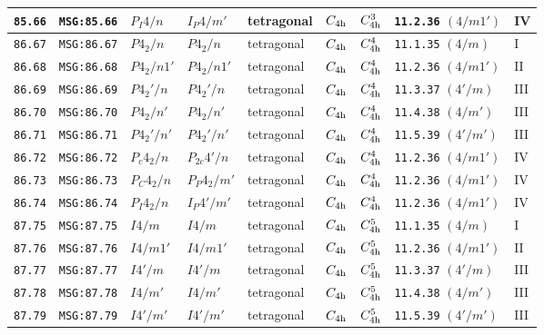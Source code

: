 \documentclass[fleqn,10pt]{jsarticle}
\begin{document}
\begin{center}
\begin{longtable}{lllllllll}
\texttt{85.66} & \texttt{MSG:85.66} & $P_{I}4/n$ & $I_{P}4/m'$ & tetragonal & $C_{\rm 4h}$ & $C_{\rm 4h}^{3}$ & \texttt{11.2.36} $(4/m1')$ & IV \\ \hline
\texttt{86.67} & \texttt{MSG:86.67} & $P4_{2}/n$ & $P4_{2}/n$ & tetragonal & $C_{\rm 4h}$ & $C_{\rm 4h}^{4}$ & \texttt{11.1.35} $(4/m)$ & I \\
\texttt{86.68} & \texttt{MSG:86.68} & $P4_{2}/n1'$ & $P4_{2}/n1'$ & tetragonal & $C_{\rm 4h}$ & $C_{\rm 4h}^{4}$ & \texttt{11.2.36} $(4/m1')$ & II \\
\texttt{86.69} & \texttt{MSG:86.69} & $P4_{2}'/n$ & $P4_{2}'/n$ & tetragonal & $C_{\rm 4h}$ & $C_{\rm 4h}^{4}$ & \texttt{11.3.37} $(4'/m)$ & III \\
\texttt{86.70} & \texttt{MSG:86.70} & $P4_{2}/n'$ & $P4_{2}/n'$ & tetragonal & $C_{\rm 4h}$ & $C_{\rm 4h}^{4}$ & \texttt{11.4.38} $(4/m')$ & III \\
\texttt{86.71} & \texttt{MSG:86.71} & $P4_{2}'/n'$ & $P4_{2}'/n'$ & tetragonal & $C_{\rm 4h}$ & $C_{\rm 4h}^{4}$ & \texttt{11.5.39} $(4'/m')$ & III \\
\texttt{86.72} & \texttt{MSG:86.72} & $P_{c}4_{2}/n$ & $P_{2c}4'/n$ & tetragonal & $C_{\rm 4h}$ & $C_{\rm 4h}^{4}$ & \texttt{11.2.36} $(4/m1')$ & IV \\
\texttt{86.73} & \texttt{MSG:86.73} & $P_{C}4_{2}/n$ & $P_{P}4_{2}/m'$ & tetragonal & $C_{\rm 4h}$ & $C_{\rm 4h}^{4}$ & \texttt{11.2.36} $(4/m1')$ & IV \\
\texttt{86.74} & \texttt{MSG:86.74} & $P_{I}4_{2}/n$ & $I_{P}4'/m'$ & tetragonal & $C_{\rm 4h}$ & $C_{\rm 4h}^{4}$ & \texttt{11.2.36} $(4/m1')$ & IV \\ \hline
\texttt{87.75} & \texttt{MSG:87.75} & $I4/m$ & $I4/m$ & tetragonal & $C_{\rm 4h}$ & $C_{\rm 4h}^{5}$ & \texttt{11.1.35} $(4/m)$ & I \\
\texttt{87.76} & \texttt{MSG:87.76} & $I4/m1'$ & $I4/m1'$ & tetragonal & $C_{\rm 4h}$ & $C_{\rm 4h}^{5}$ & \texttt{11.2.36} $(4/m1')$ & II \\
\texttt{87.77} & \texttt{MSG:87.77} & $I4'/m$ & $I4'/m$ & tetragonal & $C_{\rm 4h}$ & $C_{\rm 4h}^{5}$ & \texttt{11.3.37} $(4'/m)$ & III \\
\texttt{87.78} & \texttt{MSG:87.78} & $I4/m'$ & $I4/m'$ & tetragonal & $C_{\rm 4h}$ & $C_{\rm 4h}^{5}$ & \texttt{11.4.38} $(4/m')$ & III \\
\texttt{87.79} & \texttt{MSG:87.79} & $I4'/m'$ & $I4'/m'$ & tetragonal & $C_{\rm 4h}$ & $C_{\rm 4h}^{5}$ & \texttt{11.5.39} $(4'/m')$ & III \\

\end{longtable}
\end{center}
\end{document}
